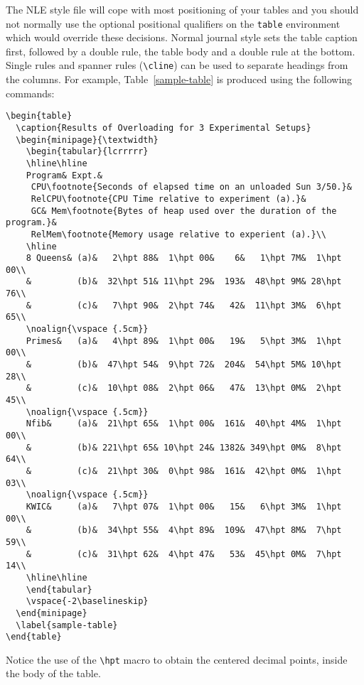 \documentclass{nle}
\begin{document}
The NLE style file will cope with most positioning of your tables
and you should not normally use the optional positional qualifiers on the
\verb"table" environment which would override these decisions.
Normal journal style sets the table caption first, followed by a double
rule, the table body and a double rule at the bottom.  Single rules and
spanner rules (\verb"\cline") can be used to separate headings from the
columns.  For example, Table~\ref{sample-table} is produced using the
following commands:\par
%
{\small
\begin{verbatim}
\begin{table}
  \caption{Results of Overloading for 3 Experimental Setups}
  \begin{minipage}{\textwidth}
    \begin{tabular}{lcrrrrr}
    \hline\hline
    Program& Expt.&
     CPU\footnote{Seconds of elapsed time on an unloaded Sun 3/50.}&
     RelCPU\footnote{CPU Time relative to experiment (a).}&
     GC& Mem\footnote{Bytes of heap used over the duration of the program.}&
     RelMem\footnote{Memory usage relative to experient (a).}\\
    \hline
    8 Queens& (a)&   2\hpt 88&  1\hpt 00&    6&   1\hpt 7M&  1\hpt 00\\
    &         (b)&  32\hpt 51& 11\hpt 29&  193&  48\hpt 9M& 28\hpt 76\\
    &         (c)&   7\hpt 90&  2\hpt 74&   42&  11\hpt 3M&  6\hpt 65\\
    \noalign{\vspace {.5cm}}
    Primes&   (a)&   4\hpt 89&  1\hpt 00&   19&   5\hpt 3M&  1\hpt 00\\
    &         (b)&  47\hpt 54&  9\hpt 72&  204&  54\hpt 5M& 10\hpt 28\\
    &         (c)&  10\hpt 08&  2\hpt 06&   47&  13\hpt 0M&  2\hpt 45\\
    \noalign{\vspace {.5cm}}
    Nfib&     (a)&  21\hpt 65&  1\hpt 00&  161&  40\hpt 4M&  1\hpt 00\\
    &         (b)& 221\hpt 65& 10\hpt 24& 1382& 349\hpt 0M&  8\hpt 64\\
    &         (c)&  21\hpt 30&  0\hpt 98&  161&  42\hpt 0M&  1\hpt 03\\
    \noalign{\vspace {.5cm}}
    KWIC&     (a)&   7\hpt 07&  1\hpt 00&   15&   6\hpt 3M&  1\hpt 00\\
    &         (b)&  34\hpt 55&  4\hpt 89&  109&  47\hpt 8M&  7\hpt 59\\
    &         (c)&  31\hpt 62&  4\hpt 47&   53&  45\hpt 0M&  7\hpt 14\\
    \hline\hline
    \end{tabular}
    \vspace{-2\baselineskip}
  \end{minipage}
  \label{sample-table}
\end{table}
\end{verbatim}}
%
\noindent Notice the use of the \verb"\hpt" macro to obtain the centered
decimal points, inside the body of the table.
\end{document}
